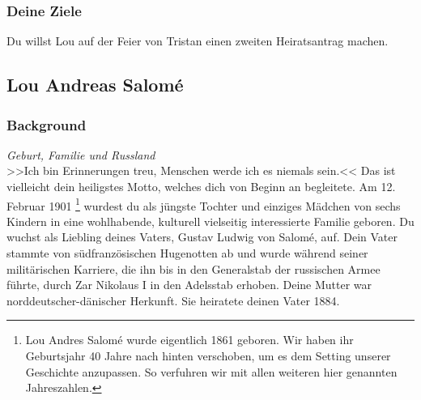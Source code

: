 \documentclass[12pt, a4paper, openany]{report}
\begin{document}
\subsubsection{Deine Ziele}
Du willst Lou auf der Feier von Tristan einen zweiten Heiratsantrag machen.

\subsection{Lou Andreas Salomé}
\subsubsection{Background}

\textit{Geburt, Familie und Russland}\\
>>Ich bin Erinnerungen treu, Menschen werde ich es niemals sein.<< 
Das ist vielleicht dein heiligstes Motto, welches dich von Beginn an begleitete.
Am 12. Februar 1901%
\footnote{
  Lou Andres Salomé wurde eigentlich 1861 geboren. 
  Wir haben ihr Geburtsjahr 40 Jahre nach hinten verschoben, um es dem Setting unserer Geschichte anzupassen. 
  So verfuhren wir mit allen weiteren hier genannten Jahreszahlen.
}
wurdest du als jüngste Tochter und einziges Mädchen von sechs Kindern in eine wohlhabende, kulturell vielseitig interessierte Familie geboren. 
Du wuchst als Liebling deines Vaters, Gustav Ludwig von Salomé, auf. 
Dein Vater stammte von südfranzösischen Hugenotten ab und wurde während seiner militärischen Karriere, die ihn bis in den Generalstab der russischen Armee führte, durch Zar Nikolaus I in den Adelsstab erhoben.
Deine Mutter war norddeutscher-dänischer Herkunft. 
Sie heiratete deinen Vater 1884.
\end{document}
